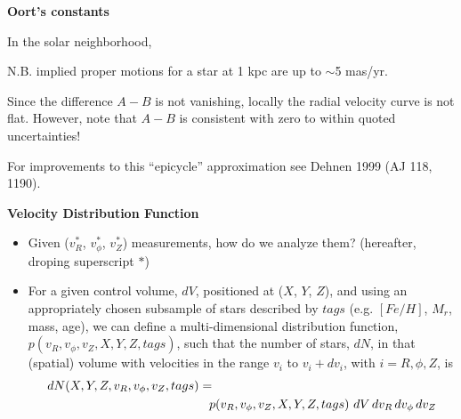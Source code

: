 \documentclass[letterpaper,landscape]{slides}
\begin{document}
\begin{slide}
\begin{center}
\bfseries
\large {} Oort's constants 
\end{center}
\vskip 0.2in

In the solar neighborhood,

N.B. implied proper motions for a star at 1 kpc are up to $\sim$5 mas/yr. 

Since the difference $A-B$ is not vanishing, locally the radial velocity curve is not flat.
However, note that $A-B$ is consistent with zero to within quoted uncertainties! 

For improvements to this ``epicycle'' approximation see Dehnen 1999 (AJ 118, 1190).

\vfill
\end{slide}




\begin{slide}

\begin{center}
\bfseries
\large {} Velocity Distribution Function
\end{center}
\vskip 0.2in
\begin{itemize}
\item {\color{blue} Given ($v_R^\ast$, $v_\phi^\ast$, $v_Z^\ast$)
    measurements, how do we analyze them?} (hereafter, droping superscript $\ast$)
\item For a given control volume, $dV$, positioned at ($X$, $Y$, $Z$), 
and using an appropriately chosen subsample of stars described by $tags$
(e.g. $[Fe/H]$, $M_r$, mass, age), we can define a multi-dimensional distribution function,
$p(v_R, v_\phi, v_Z, X, Y, Z, tags)$, such that the 
number of stars, $dN$, in that (spatial) volume with velocities in the range
$v_i$ to $v_i+dv_i$, with $i=R,\phi,Z$, is 
\begin{eqnarray}
  dN(X,Y,Z,v_R,v_\phi,v_Z,tags) =  \hskip 2.5in \nonumber \\
    p(v_R, v_\phi, v_Z, X,Y,Z,tags) \,\, dV \, dv_R \, dv_\phi \, dv_Z     \nonumber
\end{eqnarray}
\end{itemize}    

\vfill
\end{slide}
\end{document}
